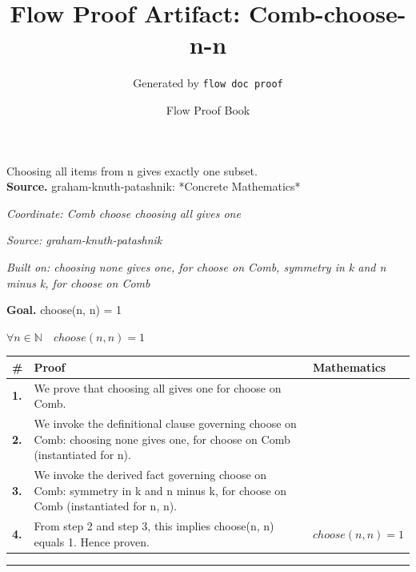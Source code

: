 \documentclass[11pt]{article}
\title{Flow Proof Artifact: Comb-choose-n-n}
\author{Generated by \texttt{flow doc proof}}
\date{Flow Proof Book}
\theoremstyle{definition}
\begin{document}
\maketitle
Choosing all items from n gives exactly one subset.\\[0.5em]
\textbf{Source.} graham-knuth-patashnik: *Concrete Mathematics*\\[0.5em]
\bigskip
{}\par
\smallskip\noindent\textit{Coordinate: Comb \cdot choose \cdot choosing all gives one}\par
\smallskip\noindent\textit{Source: graham-knuth-patashnik}\par
\smallskip\noindent\textit{Built on: choosing none gives one, for choose on Comb, symmetry in k and n minus k, for choose on Comb}\par
\medskip
\noindent\textbf{Goal.} choose(n, n) = 1\par
\noindent$\displaystyle \forall n \in \mathbb{N}\quad choose(n, n) = 1$\par
\medskip
\noindent
\begin{tabular}{@{} >{\raggedright\arraybackslash}p{} >{\raggedright\arraybackslash}p{} >{\raggedleft\arraybackslash}p{} @{}}
\textbf{\#} & \textbf{Proof} & \textbf{Mathematics} \\
\midrule
\textbf{1.} & We prove that choosing all gives one for choose on Comb. & \\[0.45em]
\textbf{2.} & We invoke the definitional clause governing choose on Comb: choosing none gives one, for choose on Comb (instantiated for n). & \\[0.45em]
\textbf{3.} & We invoke the derived fact governing choose on Comb: symmetry in k and n minus k, for choose on Comb (instantiated for n, n). & \\[0.45em]
\textbf{4.} & From step 2 and step 3, this implies choose(n, n) equals 1. Hence proven. & $\displaystyle choose(n, n) = 1$ \\[0.45em]
\bottomrule
\end{tabular}
\label{thm:Comb-choose-choosing_all_gives_one}
\par\medskip\hrule
\end{document}
